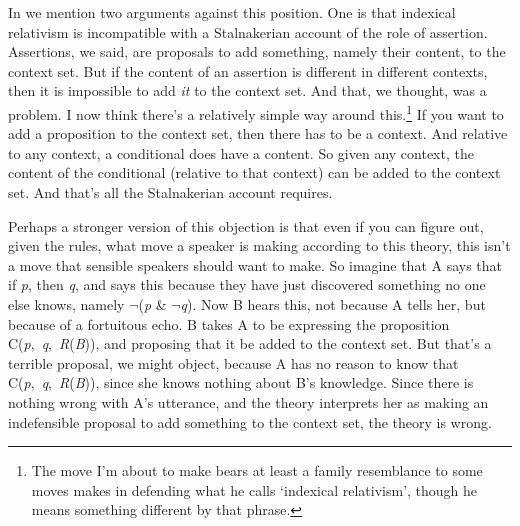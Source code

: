 In \cite{Egan2005-EGAEMI} we mention two arguments against this position. One is that indexical relativism is incompatible with a Stalnakerian account of the role of assertion. Assertions, we said, are proposals to add something, namely their content, to the context set. But if the content of an assertion is different in different contexts, then it is impossible to add \textit{it} to the context set. And that, we thought, was a problem. I now think there's a relatively simple way around this.\footnote{ The move I'm about to make bears at least a family resemblance to some moves \cite{LopezDeSa2008b} makes in defending what he calls `indexical relativism', though he means something different by that phrase.} If you want to add a proposition to the context set, then there has to be a context. And relative to any context, a conditional does have a content. So given any context, the content of the conditional (relative to that context) can be added to the context set. And that's all the Stalnakerian account requires.

Perhaps a stronger version of this objection is that even if you can figure out, given the rules, what move a speaker is making according to this theory, this isn't a move that sensible speakers should want to make. So imagine that A says that if \textit{p}, then \textit{q}, and says this because they have just discovered something no one else knows, namely \(\neg\){}(\textit{p} \& \(\neg\){}\textit{q}). Now B hears this, not because A tells her, but because of a fortuitous echo. B takes A to be expressing the proposition C(\textit{p},~\textit{q},~\textit{R}(\textit{B})), and proposing that it be added to the context set. But that's a terrible proposal, we might object, because A has no reason to know that C(\textit{p},~\textit{q},~\textit{R}(\textit{B})), since she knows nothing about B's knowledge. Since there is nothing wrong with A's utterance, and the theory interprets her as making an indefensible proposal to add something to the context set, the theory is wrong.


